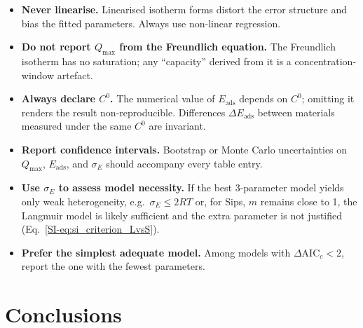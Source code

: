 \documentclass[journal=jacsat,manuscript=article]{achemso}
\begin{document}
	\begin{itemize}
		\item \textbf{Never linearise.} Linearised isotherm forms distort the error structure and bias the fitted parameters. Always use non-linear regression.
		\item \textbf{Do not report $Q_{\max}$ from the Freundlich equation.} The Freundlich isotherm has no saturation; any ``capacity'' derived from it is a concentration-window artefact.
		\item \textbf{Always declare $C^{0}$.} The numerical value of $E_{\mathrm{ads}}$ depends on $C^{0}$; omitting it renders the result non-reproducible. Differences $\Delta E_{\mathrm{ads}}$ between materials measured under the same $C^{0}$ are invariant.
		\item \textbf{Report confidence intervals.} Bootstrap or Monte Carlo uncertainties on $Q_{\max}$, $E_{\mathrm{ads}}$, and $\sigma_E$ should accompany every table entry.
		\item \textbf{Use $\sigma_E$ to assess model necessity.} If the best 3-parameter model yields only weak heterogeneity, e.g.\ $\sigma_E \leq 2RT$ or, for Sips, $m$ remains close to 1, the Langmuir model is likely sufficient and the extra parameter is not justified (Eq.~\ref{SI-eq:si_criterion_LvsS}).
		\item \textbf{Prefer the simplest adequate model.} Among models with $\Delta\mathrm{AIC}_c < 2$, report the one with the fewest parameters.
	\end{itemize}

	\section{Conclusions}
	\label{sec:conclusions}


\end{document}

